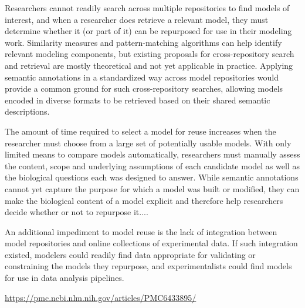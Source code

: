 \documentclass[11pt]{article}
\begin{document}
{\vspace{9pt}

\begin{blockQuote}

Researchers cannot readily search across multiple repositories to find models of interest, and when a researcher does retrieve a relevant model, they must determine whether it (or part of it) can be repurposed for use in their modeling work. Similarity measures and pattern-matching algorithms can help identify relevant modeling components, but existing proposals for cross-repository search and retrieval are mostly theoretical and not yet applicable in practice. Applying semantic annotations in a standardized way across model repositories would provide a common ground for such cross-repository searches, allowing models encoded in diverse formats to be retrieved based on their shared semantic descriptions. 

\pseudoIndent{} The amount of time required to select a model for reuse increases when the researcher must choose from a large set of potentially usable models. With only limited means to compare models automatically, researchers must manually assess the content, scope and underlying assumptions of each candidate model as well as the biological questions each was designed to answer. While semantic annotations cannot yet capture the purpose for which a model was built or modified, they can make the biological content of a model explicit and therefore help researchers decide whether or not to repurpose it....

\pseudoIndent{} An additional impediment to model reuse is the lack of integration between model repositories and online collections of experimental data. If such integration existed, modelers could readily find data appropriate for validating or constraining the models they repurpose, and experimentalists could find models for use in data analysis pipelines. 
\end{blockQuote}

\vspace*{5pt}
\hfill{}

\hfill\href{https://pmc.ncbi.nlm.nih.gov/articles/PMC6433895/}{https://pmc.ncbi.nlm.nih.gov/articles/PMC6433895/}


\vspace*{6pt}


\begin{blockQuote}


\end{blockQuote}}
\end{document}
